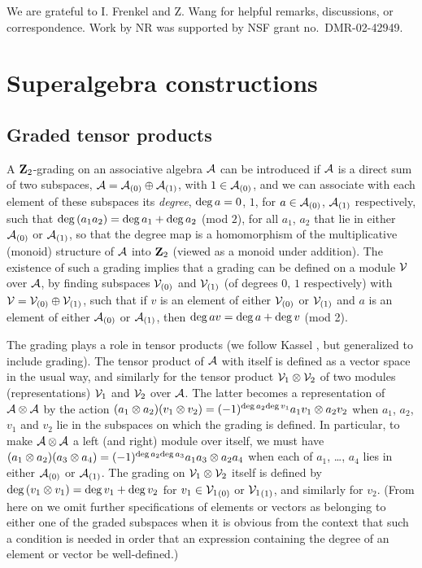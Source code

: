 \documentclass[twocolumn,floats,pra]{revtex4}
\def \cA {{\cal A}}
\begin{document}
\acknowledgments We are grateful to I. Frenkel and Z. Wang for
helpful remarks, discussions, or correspondence. Work by NR was
supported by NSF grant no.\ DMR-02-42949.


\appendix

\section{Superalgebra constructions}
\label{app}


\subsection{Graded tensor products}

A ${\bf Z}_2$-grading on an associative algebra $\cA$ can be
introduced if $\cA$ is a direct sum of two subspaces, $\cA=
\cA_{(0)}\oplus\cA_{(1)}$, with $1\in \cA_{(0)}$, and we can
associate with each element of these subspaces its {\em degree},
${\rm deg}\, a=0$, $1$, for $a\in\cA_{(0)}$, $\cA_{(1)}$
respectively, such that ${\rm deg}\,(a_1a_2)={\rm deg}\,a_1+{\rm
deg}\,a_2$ (mod $2$), for all $a_1$, $a_2$ that lie in either
$\cA_{(0)}$ or $\cA_{(1)}$, so that the degree map is a
homomorphism of the multiplicative (monoid) structure of $\cA$
into ${\bf Z}_2$ (viewed as a monoid under addition). The
existence of such a grading implies that a grading can be defined
on a module ${\cal V}$ over $\cA$, by finding subspaces ${\cal
V}_{(0)}$ and ${\cal V}_{(1)}$ (of degrees $0$, $1$ respectively)
with ${\cal V}={\cal V}_{(0)}\oplus{\cal V}_{(1)}$, such that if
$v$ is an element of either ${\cal V}_{(0)}$ or ${\cal V}_{(1)}$
and $a$ is an element of either $\cA_{(0)}$ or $\cA_{(1)}$, then
${\rm deg}\,av={\rm deg}\,a+{\rm deg}\,v$ (mod 2).


The grading plays a role in tensor products (we follow Kassel
\cite{kass}, but generalized to include grading). The tensor
product of $\cA$ with itself is defined as a vector space in the
usual way, and similarly for the tensor product ${\cal
V}_1\otimes{\cal V}_2$ of two modules (representations) ${\cal
V}_1$ and ${\cal V}_2$ over $\cA$. The latter becomes a
representation of $\cA\otimes\cA$ by the action $(a_1\otimes
a_2)(v_1\otimes v_2)=(-1)^{{\rm deg}\,a_2{\rm deg}\,v_1}a_1
v_1\otimes a_2 v_2$ when $a_1$, $a_2$, $v_1$ and $v_2$ lie in the
subspaces on which the grading is defined. In particular, to make
$\cA\otimes\cA$ a left (and right) module over itself, we must
have $(a_1\otimes a_2)(a_3\otimes a_4)=(-1)^{{\rm deg}\,a_2{\rm
deg}\,a_3}a_1a_3\otimes a_2a_4$ when each of $a_1$, \ldots, $a_4$
lies in either $\cA_{(0)}$ or $\cA_{(1)}$. The grading on ${\cal
V}_1\otimes{\cal V}_2$ itself is defined by ${\rm
deg}\,(v_1\otimes v_1)={\rm deg}\,v_1+{\deg}\,v_2$ for $v_1\in
{{\cal V}_1}_{(0)}$ or ${{\cal V}_1}_{(1)}$, and similarly for
$v_2$. (From here on we omit further specifications of elements or
vectors as belonging to either one of the graded subspaces when it
is obvious from the context that such a condition is needed in
order that an expression containing the degree of an element or
vector be well-defined.)
\end{document}
